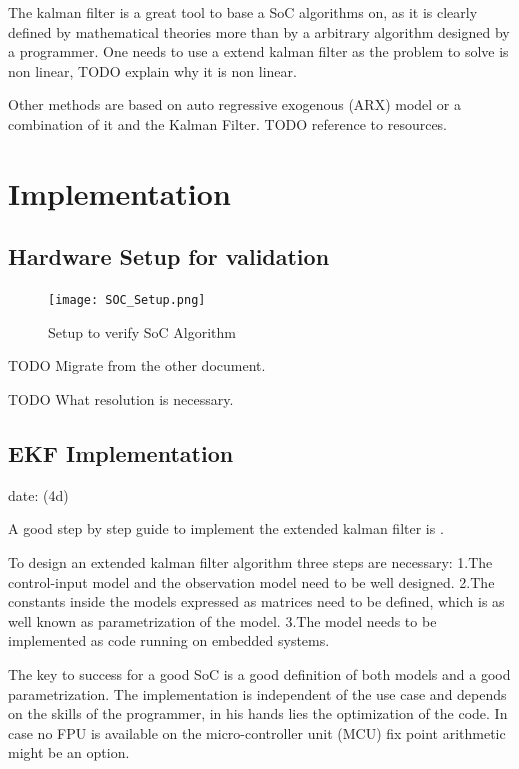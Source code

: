 \cite{espedal2021current}

The kalman filter is a great tool to base a SoC algorithms on, as it is clearly defined by mathematical theories more than by a arbitrary algorithm designed by a programmer. One needs to use a extend kalman filter as the problem to solve is non linear, TODO explain why it is non linear. 

Other methods are based on auto regressive exogenous (ARX) model or a combination of it and the Kalman Filter. TODO reference to resources.

\chapter{Implementation}

\section{Hardware Setup for validation}

\begin{figure}[!ht]
\texttt{[image: SOC\_Setup.png]}
\caption{\label{fig:SoCSetup} Setup to verify SoC Algorithm}
\end{figure}



TODO Migrate from the other document.

TODO What resolution is necessary. 

\section{EKF Implementation}
date: (4d)

A good step by step guide to implement the extended kalman filter is \cite{rzepka2021implementing}.

To design an extended kalman filter algorithm three steps are necessary:
1.The control-input model and the observation model need to be well designed. 
2.The constants inside the models expressed as matrices need to be defined, which is as well known as parametrization of the model.  
3.The model needs to be implemented as code running on embedded systems. 

The key to success for a good SoC is a good definition of both models and a good parametrization. The implementation is independent of the use case and depends on the skills of the programmer, in his  hands lies the optimization of the  code. In case no FPU is available on the micro-controller unit (MCU) fix point arithmetic might be an option.  

